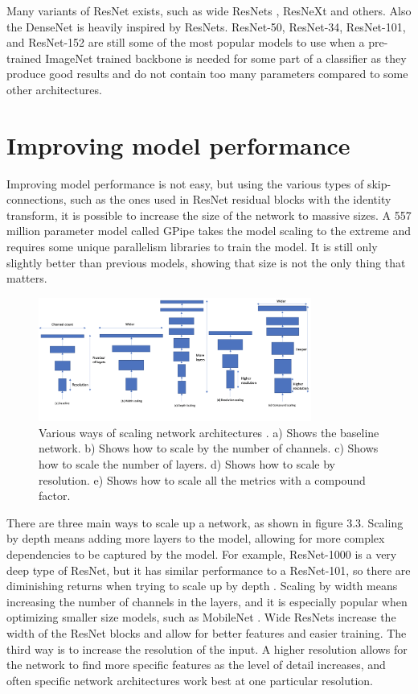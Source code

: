 Many variants of ResNet exists, such as wide ResNets \citep{wideResNet}, ResNeXt \citep{resNext} and others. Also the DenseNet \citep{denseNet} is heavily inspired by ResNets. ResNet-50, ResNet-34, ResNet-101, and ResNet-152 are still some of the most popular models to use when a pre-trained ImageNet trained backbone is needed for some part of a classifier as they produce good results and do not contain too many parameters compared to some other architectures.

\section{Improving model performance}
Improving model performance is not easy, but using the various types of skip-connections, such as the ones used in ResNet residual blocks with the identity transform, it is possible to increase the size of the network to massive sizes. A 557 million parameter model called GPipe \citep{gPipe} takes the model scaling to the extreme and requires some unique parallelism libraries to train the model. It is still only slightly better than previous models, showing that size is not the only thing that matters.

\begin{figure}[h!] 
\centering 
\includegraphics[width=0.8\textwidth]{imgs/scaling-networks-own.png}
\caption{Various ways of scaling network architectures \citep{efficientNet}. a) Shows the baseline network. b) Shows how to scale by the number of channels. c) Shows how to scale the number of layers. d) Shows how to scale by resolution. e) Shows how to scale all the metrics with a compound factor.}
\end{figure}

There are three main ways to scale up a network, as shown in figure 3.3. Scaling by depth means adding more layers to the model, allowing for more complex dependencies to be captured by the model. For example, ResNet-1000 is a very deep type of ResNet, but it has similar performance to a ResNet-101, so there are diminishing returns when trying to scale up by depth \citep{efficientNet}. Scaling by width means increasing the number of channels in the layers, and it is especially popular when optimizing smaller size models, such as MobileNet \citep{mobileNet}. Wide ResNets \citep{wideResNet} increase the width of the ResNet blocks and allow for better features and easier training. The third way is to increase the resolution of the input. A higher resolution allows for the network to find more specific features as the level of detail increases, and often specific network architectures work best at one particular resolution.

